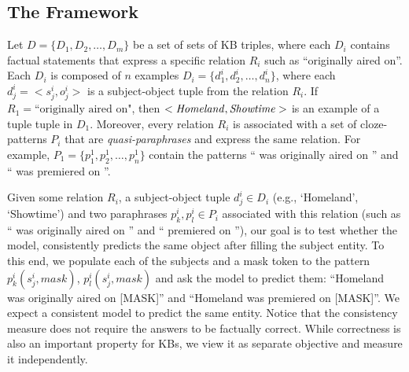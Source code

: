 \subsection{The Framework}
\label{sec:framework}
Let
$D = \{D_1, D_2,
\dots, D_m\}$
be a set of sets of KB triples,
where each $D_i$ contains factual statements
that express a specific relation $R_i$ such as ``originally aired
on''. Each $D_i$ is composed of $n$ examples $D_i = \{d_1^i,
d_2^i, \dots, d_n^i\}$, where each $d_j^i = <s_j^i,o_j^i>$
is a subject-object tuple from the relation $R_i$. 
If $R_1=\text{``originally
  aired on"}$, then $<\text{\textit{Homeland}},
\text{\textit{Showtime}}>$
is an example of a tuple
tuple in $D_1$.
Moreover, every relation $R_i$ is associated with a set of cloze-patterns $P_i$ that are \textit{quasi-paraphrases} and express the same relation. For example, $P_1=\{p_1^1, p_2^1, \dots, p_n^1\}$ contain the patterns ``\subj{} was originally aired on \obj{}'' and ``\subj{} was premiered on \obj{}''.

Given some relation $R_i$, a subject-object tuple $d_j^i \in D_i$ (e.g., `Homeland', `Showtime') and two paraphrases $p_k^i, p_l^i \in P_i$ associated with this relation (such as ``\subj{} was originally aired on \obj{}'' and ``\subj{} premiered on \obj{}''), our goal is to test whether the model, consistently predicts the same object after filling the subject entity. To this end, we populate each of the subjects and a mask token to the pattern $p_k^i(s_j^i,mask)$, $p_l^i(s_j^i,mask)$
and ask the model to predict them: ``Homeland was originally aired on [MASK]'' and ``Homeland was premiered on [MASK]''.  We expect a consistent model to predict the same entity. Notice that the consistency measure does not require the answers to be factually correct. While correctness is also an important property for KBs, we view it as separate objective and measure it independently. 


